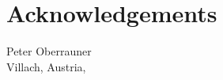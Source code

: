 \chapter*{Acknowledgements}


\vspace{2cm}


\begin{flushright}
    Peter Oberrauner \\ {\small Villach, Austria, \thisdate}
\end{flushright}